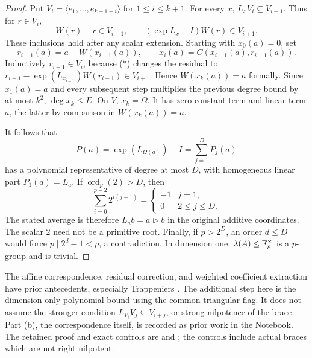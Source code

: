 \begin{proof}
Put \(V_i=\langle e_1,\ldots,e_{k+1-i}\rangle\) for \(1\le i\le k+1\).
For every \(x\), \(L_xV_i\subseteq V_{i+1}\). Thus for \(r\in V_i\),
\[
 W(r)-r\in V_{i+1},\qquad
 (\exp L_x-I)W(r)\in V_{i+1}.
\]
These inclusions hold after any scalar extension. Starting with
\(x_0(a)=0\), set
\[
 r_{i-1}(a)=a-W(x_{i-1}(a)),\qquad
 x_i(a)=C(x_{i-1}(a),r_{i-1}(a)).
\]
Inductively \(r_{i-1}\in V_i\), because (*) changes the residual to
\(r_{i-1}-\exp(L_{x_{i-1}})W(r_{i-1})\in V_{i+1}\).
Hence \(W(x_k(a))=a\) formally. Since \(x_1(a)=a\) and every subsequent
step multiplies the previous degree bound by at most \(k^2\),
\(\deg x_k\le E\). On \(V\), \(x_k=\Omega\). It has zero constant term
and linear term \(a\), the latter by comparison in \(W(x_k(a))=a\).

It follows that
\[
 P(a)=\exp(L_{\Omega(a)})-I=\sum_{j=1}^{D}P_j(a)
\]
has a polynomial representative of degree at most \(D\), with homogeneous
linear part \(P_1(a)=L_a\). If \(\operatorname{ord}_p(2)>D\), then
\[
 \sum_{i=0}^{p-2}2^{i(j-1)}
 =\begin{cases}-1&j=1,\\0&2\le j\le D.\end{cases}
\]
The stated average is therefore \(L_ab=a\mathbin{\triangleright}b\)
in the original additive coordinates. The scalar \(2\) need not be a
primitive root. Finally, if \(p>2^D\), an order \(d\le D\) would force
\(p\mid2^d-1<p\), a contradiction. In dimension one,
\(\lambda(A)\le\mathbb F_p^\times\) is a \(p\)-group and is trivial.
\end{proof}

The affine correspondence, residual correction, and weighted coefficient
extraction have prior antecedents, especially Trappeniers
\cite[Proposition~5.5 and Section~6]{trappeniers}.
The additional step here is the dimension-only polynomial bound using
the common triangular flag. It does not assume the stronger condition
\(L_{V_i}V_j\subseteq V_{i+j}\), or strong nilpotence of the brace.
Part (b), the correspondence itself, is recorded as prior work in the
Notebook. The retained proof and exact controls are
 and
; the controls include actual braces
which are not right nilpotent.
